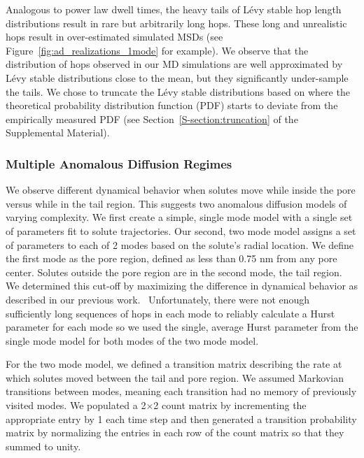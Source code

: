\documentclass[aps,pre,preprint,groupedaddress,longbibliography]{revtex4-2}
\begin{document}
  Analogous to power law dwell times, the heavy tails of L\'evy stable hop
  length distributions result in rare but arbitrarily long hops. These long and
  unrealistic hops result in over-estimated simulated MSDs (see
  Figure~\ref{fig:ad_realizations_1mode} for example). We observe that the
  distribution of hops observed in our MD simulations are well approximated by
  L\'evy stable distributions close to the mean, but they significantly
  under-sample the tails. We chose to truncate the L\'evy stable distributions
  based on where the theoretical probability distribution function (PDF) starts
  to deviate from the empirically measured PDF (see
  Section~\ref{S-section:truncation} of the Supplemental
  Material).~\cite{mantegna_stochastic_1994}

  \subsubsection*{Multiple Anomalous Diffusion Regimes}
  
  We observe different dynamical behavior when solutes move while inside the
  pore versus while in the tail region. This suggests two anomalous diffusion
  models of varying complexity. We first create a simple, single mode model
  with a single set of parameters fit to solute trajectories. Our second, two
  mode model assigns a set of parameters to each of 2 modes based on the
  solute's radial location. We define the first mode as the pore region,
  defined as less than 0.75 nm from any pore center. Solutes outside the pore
  region are in the second mode, the tail region. We determined this cut-off by
  maximizing the difference in dynamical behavior as described in our previous
  work.~\cite{coscia_chemically_2019} Unfortunately, there were not enough
  sufficiently long sequences of hops in each mode to reliably calculate a
  Hurst parameter for each mode so we used the single, average Hurst parameter
  from the single mode model for both modes of the two mode model.
 
  For the two mode model, we defined a transition matrix describing the rate at
  which solutes moved between the tail and pore region. We assumed Markovian
  transitions between modes, meaning each transition had no memory of
  previously visited modes. We populated a 2$\times$2 count matrix by
  incrementing the appropriate entry by 1 each time step and then generated a
  transition probability matrix by normalizing the entries in each row of the
  count matrix so that they summed to unity.
  
\end{document}
